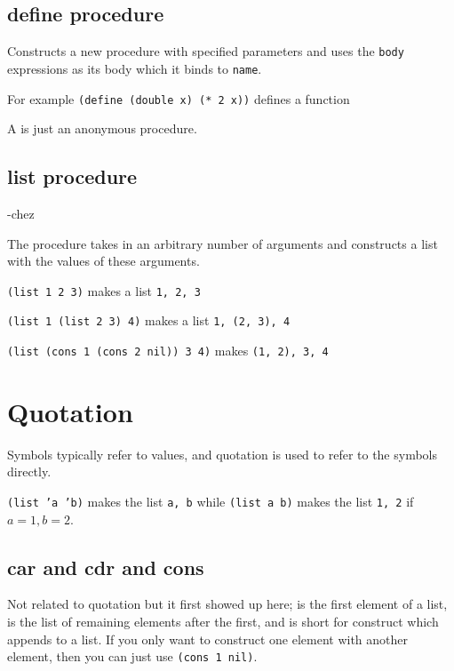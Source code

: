 \documentclass{scrartcl}
\begin{document}
\subsection{define procedure}
Constructs a new procedure with specified parameters
and uses the \texttt{body} expressions as its body
which it binds to \texttt{name}.

For example \texttt{(define (double x) (* 2 x))} defines 
a function 

A  is just an anonymous procedure.

\subsection{list procedure}
 -chez

The  procedure takes in an arbitrary number
of arguments and constructs a list with the values of 
these arguments.

\texttt{(list 1 2 3)} makes a list \texttt{1, 2, 3}

\texttt{(list 1 (list 2 3) 4)} makes a list \texttt{1, (2, 3), 4}

\texttt{(list (cons 1 (cons 2 nil)) 3 4)} makes \texttt{(1, 2), 3, 4}
\section{Quotation}
Symbols typically refer to values, and quotation is used to refer 
to the symbols directly. 

\texttt{(list 'a 'b)} makes the list \texttt{a, b}
while \texttt{(list a b)} makes the list \texttt{1, 2}
if $a=1, b=2$.

\subsection{car and cdr and cons}
Not related to quotation but it first showed up here; 
 is the first element of a list, 
is the list of remaining elements after the first, and 
 is short for construct which appends to a list. 
If you only want to construct one element 
with another element, then you can just use \texttt{(cons 1 nil)}.
\end{document}

